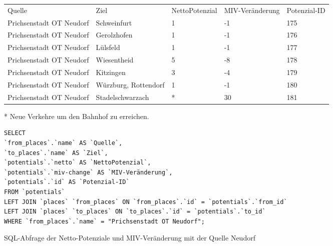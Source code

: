 \begin{tabularx}{\textwidth}{*5{X}}
Quelle & Ziel & NettoPotenzial & MIV-Veränderung & Potenzial-ID\\ 
Prichsenstadt OT Neudorf & Schweinfurt & 1 & -1 & 175\\ 
Prichsenstadt OT Neudorf & Gerolzhofen & 1 & -1 & 176\\ 
Prichsenstadt OT Neudorf & Lülsfeld & 1 & -1 & 177\\ 
Prichsenstadt OT Neudorf & Wiesentheid & 5 & -8 & 178\\ 
Prichsenstadt OT Neudorf & Kitzingen & 3 & -4 & 179\\ 
Prichsenstadt OT Neudorf & Würzburg, Rottendorf & 1 & -1 & 180\\ 
Prichsenstadt OT Neudorf & Stadelschwarzach & * & 30 & 181\\ 
\end{tabularx}
\newline
\newline
* Neue Verkehre um den Bahnhof zu erreichen.
\newline
\begin{listing}[htbp]
\begin{verbatim}
SELECT
`from_places`.`name` AS `Quelle`, 
`to_places`.`name` AS `Ziel`, 
`potentials`.`netto` AS `NettoPotenzial`, 
`potentials`.`miv-change` AS `MIV-Veränderung`, 
`potentials`.`id` AS `Potenzial-ID`
FROM `potentials`
LEFT JOIN `places` `from_places` ON `from_places`.`id` = `potentials`.`from_id`
LEFT JOIN `places` `to_places` ON `to_places`.`id` = `potentials`.`to_id`
WHERE `from_places`.`name` = "Prichsenstadt OT Neudorf";
\end{verbatim}
\caption{SQL-Abfrage der Netto-Potenziale und MIV-Veränderung mit der Quelle Neudorf}\label{lst-fz-neudorf}
\end{listing}